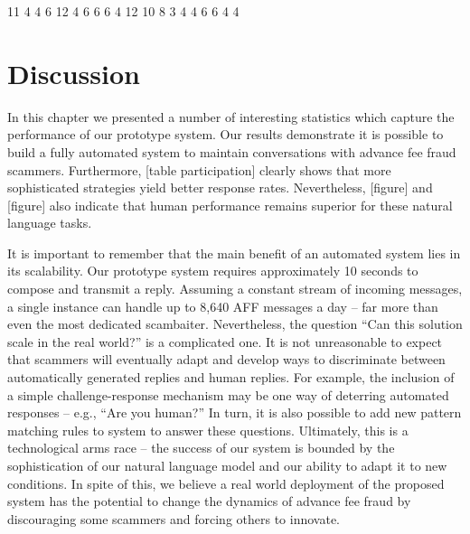 


11
4
4
6
12
4
6
6
6
4
12
10
8
3
4
4
6
6
4
4

\section{Discussion}
In this chapter we presented a number of interesting statistics which capture the performance of our prototype system. Our results demonstrate it is possible to build a fully automated system
to maintain conversations with advance fee fraud scammers. Furthermore, [table participation] clearly shows that more sophisticated strategies yield better response rates. Nevertheless, [figure] and [figure] also indicate that human performance remains superior for these natural language tasks.

It is important to remember that the main benefit of an automated system lies in its scalability. Our prototype system requires approximately 10 seconds to compose and transmit a reply. Assuming a constant stream of incoming messages, a single instance can handle up to 8,640 AFF messages a day -- far more than even the most dedicated scambaiter. Nevertheless, the question ``Can this solution scale in the real world?'' is a complicated one. It is not unreasonable to expect that scammers will eventually adapt and develop ways to discriminate between automatically generated replies and human replies. For example, the inclusion of a simple challenge-response mechanism may be one way of deterring automated responses -- e.g., ``Are you human?'' In turn, it is also possible to add new pattern matching rules to system to answer these questions. Ultimately, this is a technological arms race -- the success of our system is bounded by the sophistication of our natural language model and our ability to adapt it to new conditions. In spite of this, we believe a real world deployment of the proposed system has the potential to change the dynamics of advance fee fraud by discouraging some scammers and forcing others to innovate.
